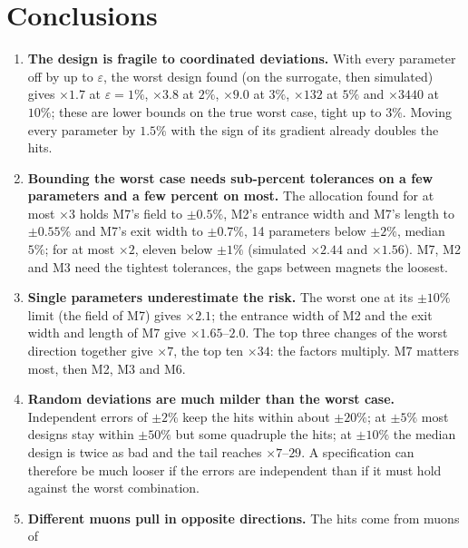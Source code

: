 \documentclass[11pt,a4paper]{article}
\begin{document}
\clearpage
\section{Conclusions}

\begin{enumerate}
  \item \textbf{The design is fragile to coordinated deviations.} With every parameter off by up
        to $\varepsilon$, the worst design found (on the surrogate, then simulated) gives
        $\times1.7$ at $\varepsilon=1\%$, $\times3.8$ at $2\%$, $\times9.0$ at $3\%$, $\times132$ at
        $5\%$ and $\times3440$ at $10\%$; these are lower bounds on the true worst case, tight up
        to $3\%$. Moving every parameter by $1.5\%$ with the sign of its gradient already doubles
        the hits.
  \item \textbf{Bounding the worst case needs sub-percent tolerances on a few parameters and a
        few percent on most.} The allocation found for at most $\times3$ holds M7's field to
        $\pm0.5\%$, M2's entrance width and M7's length to $\pm0.55\%$ and M7's exit width to
        $\pm0.7\%$, 14 parameters below $\pm2\%$, median $5\%$; for at most $\times2$, eleven below
        $\pm1\%$ (simulated $\times2.44$ and $\times1.56$). M7, M2 and M3 need the tightest
        tolerances, the gaps between magnets the loosest.
  \item \textbf{Single parameters underestimate the risk.} The worst one at its $\pm10\%$ limit
        (the field of M7) gives $\times2.1$; the entrance width of M2 and the exit width and length
        of M7 give $\times1.65$--$2.0$. The top three changes of the worst direction together
        give $\times7$, the top ten $\times34$: the factors multiply. M7 matters most, then M2,
        M3 and M6.
  \item \textbf{Random deviations are much milder than the worst case.} Independent errors of
        $\pm2\%$ keep the hits within about $\pm20\%$; at $\pm5\%$ most designs stay within
        $\pm50\%$ but some quadruple the hits; at $\pm10\%$ the median design is twice as bad and
        the tail reaches $\times7$--$29$. A specification can therefore be much looser if
        the errors are independent than if it must hold against the worst combination.
  \item \textbf{Different muons pull in opposite directions.} The hits come from muons of

\end{enumerate}
\end{document}
